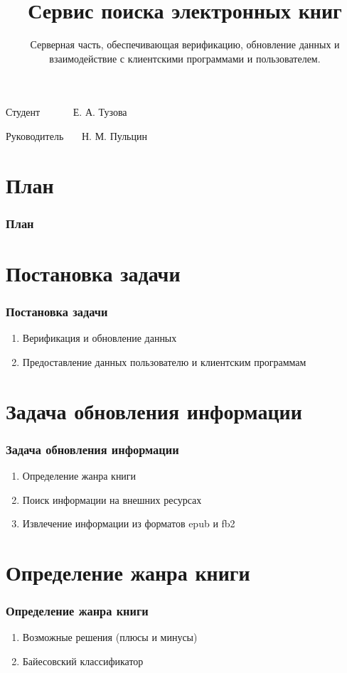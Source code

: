 \documentclass[handout]{beamer}
\title{Сервис поиска электронных книг }
\subtitle{Серверная часть, обеспечивающая верификацию, обновление данных и взаимодействие с клиентскими программами и пользователем.}
\date{}
\begin{document}
\begin{frame}
  \titlepage

  \begin{flushright}
    Студент~~~~~~  Е. А. Тузова
  
    Руководитель~~~  Н. М. Пульцин

  \end{flushright}
\end{frame}

\section*{План}
  \begin{frame}
    \frametitle{План}
    \tableofcontents[pausesections]

  \end{frame}

\section{Постановка задачи}
  \begin{frame}

    \frametitle{Постановка задачи}
    \begin{enumerate}
      \item Верификация и обновление данных
      \item Предоставление данных пользователю и клиентским программам
    \end{enumerate}
  \end{frame}

\section{Задача обновления информации}
  \begin{frame}
    \frametitle{Задача обновления информации}
  
    \begin{enumerate}
      \item Определение жанра книги
      \item Поиск информации на внешних ресурсах
      \item Извлечение информации из форматов epub и fb2 
    \end{enumerate}
  \end{frame}

\section{Определение жанра книги}
  \begin{frame}
    \frametitle{Определение жанра книги}  
    
    \begin{enumerate}
      \item Возможные решения (плюсы и минусы)
      \item Байесовский классификатор
    \end{enumerate}        
  \end{frame}
\end{document}

